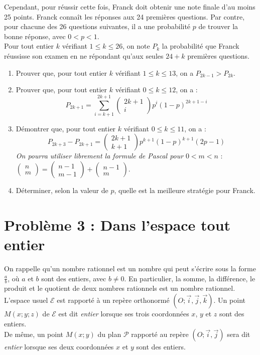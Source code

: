 \documentclass[landscape,twocolumn,leqno,a4paper,10pt]{report} %
\newcommand\n{\noindent}
\renewcommand{\leq}{\leqslant}
\newcommand*{\binomial}[2]{%
  \ensuremath{ 
    \begin{pmatrix} 
      #2\\ 
      #1
    \end{pmatrix}}}				%
\renewcommand{\binom}{\binomial} 	%
\begin{document}
\n Cependant, pour réussir cette fois, Franck doit obtenir une note finale d'au moins 25 points. Franck connaît les réponses aux 24 premières questions. Par contre, pour chacune des 26 questions suivantes, il a une probabilité $p$ de trouver la bonne réponse, avec $0<p<1$.\\

\n Pour tout entier $k$ vérifiant $1 \leq k \leq 26$, on note $P_{k}$ la probabilité que Franck réussisse son examen en ne répondant qu'aux seules $24+k$ premières questions.

\begin{enumerate}
	\item Prouver que, pour tout entier $k$ vérifiant $1 \leq k \leq 13$, on a $P_{2 k-1}>P_{2 k}$.
	\item Prouver que, pour tout entier $k$ vérifiant $0 \leq k \leq 12$, on a :
	$$P_{2 k+1}=\sum_{i=k+1}^{2 k+1}\binom{i}{2k+1} p^{i}(1-p)^{2 k+1-i}$$
	\item Démontrer que, pour tout entier $k$ vérifiant $0 \leq k \leq 11$, on a :
	$$P_{2 k+3}-P_{2 k+1}=\binom{k+1}{2k+1} p^{k+1}(1-p)^{k+1}(2 p-1)$$
	\textit{On pourra utiliser librement la formule de Pascal pour} $0<m<n$ : $\binom{m}{n}=\binom{m-1}{n-1}+\binom{m}{n-1}$.
	\item Déterminer, selon la valeur de $p$, quelle est la meilleure stratégie pour Franck.
\end{enumerate}


\section{Problème 3 : Dans l'espace tout entier}

\n On rappelle qu'un nombre rationnel est un nombre qui peut s'écrire sous la forme $\frac{a}{b}$, où $a$ et $b$ sont des entiers, avec $b \neq 0$. En particulier, la somme, la différence, le produit et le quotient de deux nombres rationnels est un nombre rationnel.\\

\n L'espace usuel $\mathscr{E}$ est rapporté à un repère orthonormé $\left(O ; \vec{i}, \vec{j}, \vec{k}\right)$. Un point $M(x ; y ; z)$ de $\mathscr{E}$ est dit \textit{entier} lorsque ses trois coordonnées $x$, $y$ et $z$ sont des entiers.\\
De même, un point $M(x ; y)$ du plan $\mathscr{P}$ rapporté au repère $\left(O ; \vec{i}, \vec{j}\right)$ sera dit \textit{entier} lorsque ses deux coordonnées $x$ et $y$ sont des entiers.\\
\end{document}
